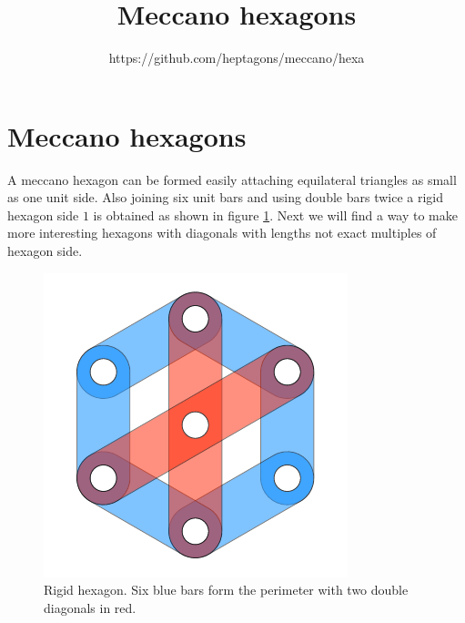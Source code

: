 \documentclass[11pt]{article}
\title{\textbf{Meccano hexagons}}
\author{https://github.com/heptagons/meccano/hexa}
\date{}
\begin{document}
\maketitle

\section{Meccano hexagons}

A meccano hexagon can be formed easily attaching equilateral
triangles as small as one unit side. Also joining six unit bars and using
double bars twice a rigid hexagon side $1$ is obtained as shown in figure \ref{fig:1}.
Next we will find a way to make more interesting hexagons with diagonals with lengths not exact
multiples of hexagon side.

\begin{figure}[htpb]
\centering
\includegraphics[scale=0.5]{figs/hexagon-1}
\caption{Rigid hexagon. Six blue bars form the perimeter with two double
diagonals in red.}
\label{fig:1}
\end{figure}
\end{document}
